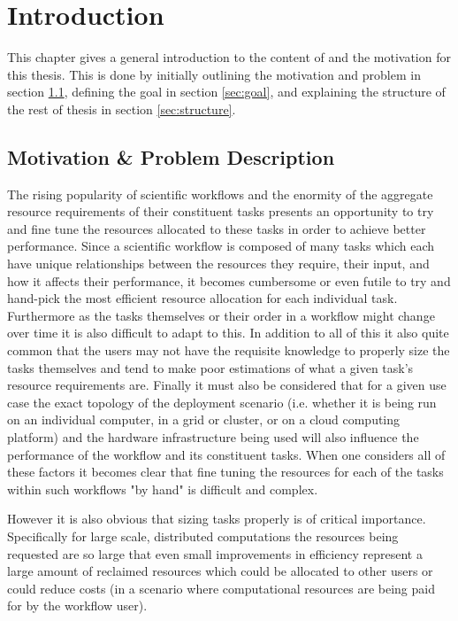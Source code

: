 
\cleardoublepage
\chapter{Introduction}
\label{cha:introduction}

This chapter gives a general introduction to the content of and the motivation for this thesis. This is done by initially outlining the motivation and problem in section \ref{sec:motivation}, defining the goal in section \ref{sec:goal}, and explaining the structure of the rest of thesis in section \ref{sec:structure}.

\section{Motivation \& Problem Description}
\label{sec:motivation}

The rising popularity of scientific workflows and the enormity of the aggregate resource requirements of their constituent tasks \cite{ResourceProvisioning} presents an opportunity to try and fine tune the resources allocated to these tasks in order to achieve better performance. Since a scientific workflow is composed of many tasks which each have unique relationships between the resources they require, their input, and how it affects their performance, it becomes cumbersome or even futile to try and hand-pick the most efficient resource allocation for each individual task. Furthermore as the tasks themselves or their order in a workflow might change over time it is also difficult to adapt to this. In addition to all of this it also quite common that the users may not have the requisite knowledge to properly size the tasks themselves and tend to make poor estimations \cite{Predictability} of what a given task's resource requirements are. Finally it must also be considered that for a given use case the exact topology of the deployment scenario (i.e. whether it is being run on an individual computer, in a grid or cluster, or on a cloud computing platform) and the hardware infrastructure being used will also influence the performance of the workflow and its constituent tasks.  When one considers all of these factors it becomes clear that fine tuning the resources for each of the tasks within such workflows "by hand" is difficult and complex. 

However it is also obvious that sizing tasks properly is of critical importance. Specifically for large scale, distributed computations the resources being requested are so large that even small improvements in efficiency represent a large amount of reclaimed resources which could be allocated to other users or could reduce costs (in a scenario where computational resources are being paid for by the workflow user). 

